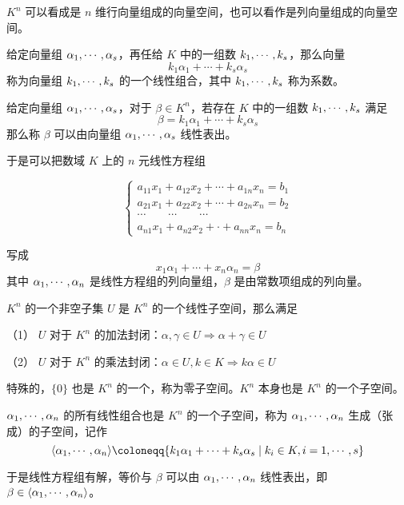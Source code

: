 $K^n$ 可以看成是 $n$ 维行向量组成的向量空间，也可以看作是列向量组成的向量空间。

\begin{definition}[线性组合]
	给定向量组 $\alpha_1,\cdots,\alpha_s$，再任给 $K$ 中的一组数 $k_1,\cdots,k_s$，那么向量
	\[k_1 \alpha_1+\cdots+k_s \alpha_s\]
	称为向量组 $k_1,\cdots,k_s$ 的一个线性组合，其中 $k_1,\cdots,k_s$ 称为系数。
\end{definition}

\begin{definition}[线性表出]
	给定向量组 $\alpha_1,\cdots,\alpha_s$，对于 $\beta \in K^n$，若存在 $K$ 中的一组数 $k_1,\cdots,k_s$ 满足
	\[\beta = k_1\alpha_1+\cdots+k_s\alpha_s\]
	那么称 $\beta$ 可以由向量组 $\alpha_1,\cdots,\alpha_s$ 线性表出。
\end{definition}

于是可以把数域 $K$ 上的 $n$ 元线性方程组

\begin{equation*}
	\left\{
	\begin{matrix}
		a_{11}x_1+a_{12}x_2+\cdots+a_{1n}x_n=b_1 \\
		a_{21}x_1+a_{22}x_2+\cdots+a_{2n}x_n=b_2 \\
		\cdots\qquad\cdots\qquad\cdots           \\
		a_{n1}x_1+a_{n2}x_2+\cdot +a_{nn}x_n=b_n
	\end{matrix}
	\right.
\end{equation*}

写成
\[x_1\alpha_1+\cdots+x_n\alpha_n=\beta\]
其中 $\alpha_1,\cdots,\alpha_n$ 是线性方程组的列向量组，$\beta$ 是由常数项组成的列向量。

\begin{definition}[线性子空间]
	$K^n$ 的一个非空子集 $U$ 是 $K^n$ 的一个线性子空间，那么满足

	（1） $U$ 对于 $K^n$ 的加法封闭：$\alpha,\gamma\in U \Rightarrow \alpha+\gamma \in U$

	（2） $U$ 对于 $K^n$ 的乘法封闭：$\alpha \in U,k\in K \Rightarrow k\alpha \in U$
\end{definition}

特殊的，$\{0\}$ 也是 $K^n$ 的一个，称为零子空间。$K^n$ 本身也是 $K^n$ 的一个子空间。

$\alpha_1,\cdots,\alpha_n$ 的所有线性组合也是 $K^n$ 的一个子空间，称为 $\alpha_1,\cdots,\alpha_n$ 生成（张成）的子空间，记作
\[\langle \seq{\alpha}{n}\rangle\coloneqq \{k_1\alpha_1+\cdots+k_s\alpha_s \mid k_i\in K,i=1,\cdots,s\}\]

于是线性方程组有解，等价与 $\beta$ 可以由 $\alpha_1,\cdots,\alpha_n$ 线性表出，即 $\beta \in \langle\alpha_1,\cdots,\alpha_n\rangle$。

